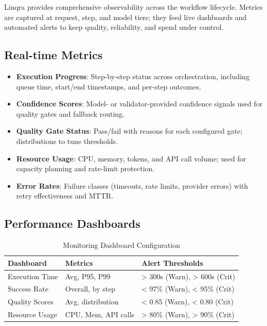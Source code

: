 \documentclass[11pt,a4paper]{article}
\begin{document}
Linqra provides comprehensive observability across the workflow lifecycle. Metrics are captured at request, step, and model tiers; they feed live dashboards and automated alerts to keep quality, reliability, and spend under control.

\subsection{Real-time Metrics}

\begin{itemize}
    \item \textbf{Execution Progress}: Step-by-step status across orchestration, including queue time, start/end timestamps, and per-step outcomes.
    \item \textbf{Confidence Scores}: Model- or validator-provided confidence signals used for quality gates and fallback routing.
    \item \textbf{Quality Gate Status}: Pass/fail with reasons for each configured gate; distributions to tune thresholds.
    \item \textbf{Resource Usage}: CPU, memory, tokens, and API call volume; used for capacity planning and rate-limit protection.
    \item \textbf{Error Rates}: Failure classes (timeouts, rate limits, provider errors) with retry effectiveness and MTTR.
\end{itemize}

\subsection{Performance Dashboards}

\begin{table}[H]
\centering
\renewcommand{\arraystretch}{1.25}
\setlength{\tabcolsep}{6pt}
\begin{tabularx}{\textwidth}{|l|l|X|}
\hline
\textbf{Dashboard} & \textbf{Metrics} & \textbf{Alert Thresholds} \\
\hline
Execution Time & Avg, P95, P99 & > 300s (Warn), > 600s (Crit) \\
Success Rate & Overall, by step & < 97\% (Warn), < 95\% (Crit) \\
Quality Scores & Avg, distribution & < 0.85 (Warn), < 0.80 (Crit) \\
Resource Usage & CPU, Mem, API calls & > 80\% (Warn), > 90\% (Crit) \\
\hline
\end{tabularx}
\caption{Monitoring Dashboard Configuration}
\end{table}
\end{document}
